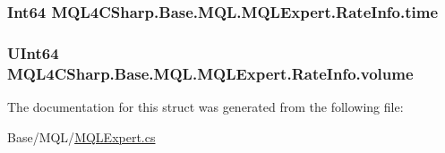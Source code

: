 \subsubsection[{\texorpdfstring{time}{time}}]{\setlength{\rightskip}{0pt plus 5cm}Int64 M\+Q\+L4\+C\+Sharp.\+Base.\+M\+Q\+L.\+M\+Q\+L\+Expert.\+Rate\+Info.\+time}\hypertarget{struct_m_q_l4_c_sharp_1_1_base_1_1_m_q_l_1_1_m_q_l_expert_1_1_rate_info_ae41ed969d47d81057cf5d3c353aa2758}{}\label{struct_m_q_l4_c_sharp_1_1_base_1_1_m_q_l_1_1_m_q_l_expert_1_1_rate_info_ae41ed969d47d81057cf5d3c353aa2758}
\subsubsection[{\texorpdfstring{volume}{volume}}]{\setlength{\rightskip}{0pt plus 5cm}U\+Int64 M\+Q\+L4\+C\+Sharp.\+Base.\+M\+Q\+L.\+M\+Q\+L\+Expert.\+Rate\+Info.\+volume}\hypertarget{struct_m_q_l4_c_sharp_1_1_base_1_1_m_q_l_1_1_m_q_l_expert_1_1_rate_info_a4909b697563b89b879645dfa5a2a6aba}{}\label{struct_m_q_l4_c_sharp_1_1_base_1_1_m_q_l_1_1_m_q_l_expert_1_1_rate_info_a4909b697563b89b879645dfa5a2a6aba}


The documentation for this struct was generated from the following file\+:\begin{DoxyCompactItemize}
\item 
Base/\+M\+Q\+L/\hyperlink{_m_q_l_expert_8cs}{M\+Q\+L\+Expert.\+cs}\end{DoxyCompactItemize}
